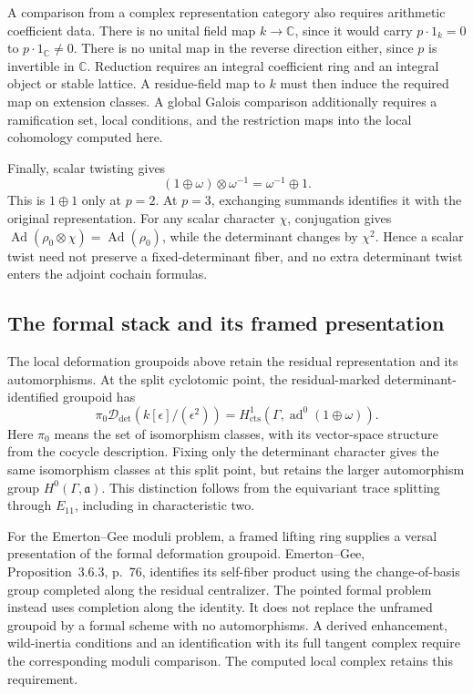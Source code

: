 A comparison from a complex representation category also requires
arithmetic coefficient data. There is no unital field map
\(k\to\mathbb C\), since it would carry \(p\cdot1_k=0\) to
\(p\cdot1_{\mathbb C}\ne0\). There is no unital map in the reverse
direction either, since \(p\) is invertible in \(\mathbb C\).
Reduction requires an integral coefficient ring and an integral
object or stable lattice. A residue-field map to \(k\) must then
induce the required map on extension classes. A global Galois comparison
additionally requires a ramification set, local conditions, and the
restriction maps into the local cohomology computed here.

Finally, scalar twisting gives
\[
 (1\oplus\omega)\otimes\omega^{-1}=\omega^{-1}\oplus1.
\]
This is \(1\oplus1\) only at \(p=2\). At \(p=3\), exchanging summands
identifies it with the original representation.
For any scalar character \(\chi\), conjugation gives
\(\operatorname{Ad}(\rho_0\otimes\chi)=\operatorname{Ad}(\rho_0)\),
while the determinant changes by \(\chi^2\).
Hence a scalar twist need not preserve a fixed-determinant fiber, and
no extra determinant twist enters the adjoint cochain formulas.


\subsection{The formal stack and its framed presentation}
\label{v4-arith:ic:w10-d:prop:EG-closed-point-s1}
The local deformation groupoids above retain the residual representation
and its automorphisms. At the split cyclotomic point, the
residual-marked determinant-identified groupoid has
\begin{equation}\label{v4-arith:ic:w10-d:eq:EG-tangent-s1}
 \pi_0\mathcal D_{\mathrm{det}}(k[\epsilon]/(\epsilon^2))
       =H^1_{\mathrm{cts}}(\Gamma,\operatorname{ad}^0(1\oplus\omega)).
\end{equation}
Here $\pi_0$ means the set of isomorphism classes, with its vector-space
structure from the cocycle description. Fixing only the determinant
character gives the same isomorphism classes at this split point,
but retains the larger automorphism group $H^0(\Gamma,\mathfrak a)$.
This distinction follows from the equivariant trace splitting through
$E_{11}$, including in characteristic two.

For the Emerton--Gee moduli problem, a framed lifting ring supplies a
versal presentation of the formal deformation groupoid.
Emerton--Gee, Proposition~3.6.3, p.~76, identifies its self-fiber product
using the change-of-basis group completed along the residual centralizer.
The pointed formal problem instead uses completion along the identity.
It does not replace the unframed groupoid by a formal scheme with
no automorphisms. A derived enhancement, wild-inertia conditions and
an identification with its full tangent complex require the corresponding
moduli comparison. The computed local complex retains this requirement.

